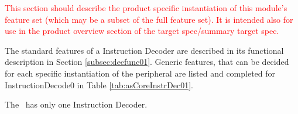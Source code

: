 \textcolor{red}{This section should describe the product specific instantiation of this module’s feature set (which may be a subset of the full feature set). It is intended also for use in the product overview section of the target spec/summary target spec.}

The standard features of a Instruction Decoder are described in its functional description in Section \ref{subsec:decfunc01}. Generic features, that can be decided for each specific instantiation of the peripheral are listed and completed for InstructionDecode0 in Table \ref{tab:asCoreInstrDec01}.

The \aschip \, has only one Instruction Decoder.
